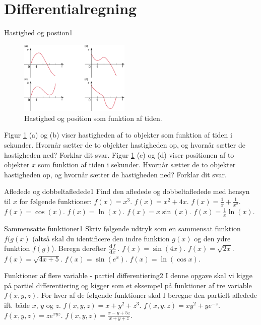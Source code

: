 \section*{Differentialregning}
\begin{opgave}{Hastighed og postion}{1}
	\begin{figure}[h!]
		\centering
		\includegraphics[width=0.47\textwidth]{matematik/vx_grafer.png}
		\caption{Hastighed og position som funktion af tiden.}
		\label{fig:vx_grafer}
	\end{figure}
	\opg Figur \ref{fig:vx_grafer} (a) og (b) viser hastigheden af to objekter som funktion af tiden i sekunder. Hvornår sætter de to objekter hastigheden op, og hvornår sætter de hastigheden ned? Forklar dit svar.
	\opg Figur \ref{fig:vx_grafer} (c) og (d) viser positionen af to objekter $x$ som funktion af tiden i sekunder. Hvornår sætter de to objekter hastigheden op, og hvornår sætter de hastigheden ned? Forklar dit svar.\\
\end{opgave}
\begin{opgave}{Afledede og dobbeltafledede}{1}
Find den afledede og dobbeltafledede med hensyn til $x$ for følgende funktioner:
\opg $f(x) = x^3.$
\opg $f(x) = x^2 + 4x.$
\opg $f(x) = \frac{1}{x} + \frac{1}{x^2}.$
\opg $f(x) = \cos(x).$
\opg $f(x) = \ln(x).$
\opg $f(x) = x \sin(x).$
\opg $f(x) = \frac{1}{x} \ln(x).$ \\
\end{opgave}
\begin{opgave}{Sammensatte funktioner}{1}
Skriv følgende udtryk som en sammensat funktion $f(g(x)$ (altså skal du identificere den indre funktion $g(x)$ og den ydre funktion $f(g)$). Beregn derefter $\dif{x}{f}$. 
\opg $f(x) = \sin (4x).$
\opg $f(x) = \sqrt{2x}.$
\opg $f(x) = \sqrt{4x+5}.$
\opg $f(x) = \sin(e^x).$
\opg $f(x) =  \ln \left( \cos x \right).$ \\
\end{opgave}
\begin{opgave}{Funktioner af flere variable - partiel differentiering}{2}
I denne opgave skal vi kigge på partiel differentiering og kigger som et eksempel på funktioner af tre variable $f(x,y,z)$. For hver af de følgende funktioner skal I beregne den partielt afledede ift. både $x$, $y$ og $z$.
\opg $f(x,y,z) = x +y^2 + z^3.$
\opg $f(x,y,z) = x y^2 +  ye^{-z}.$
\opg $f(x,y,z) = ze^{xyz}.$
\opg $f(x,y,z) = \frac{x-y+5z}{x+y+z}.$ \\
\end{opgave}
